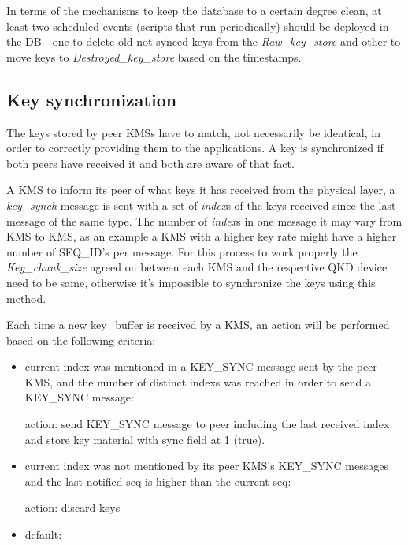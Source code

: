 \begin{refsection}
In terms of the mechanisms to keep the database to a certain degree clean, at least two scheduled events (scripts that run periodically) should be deployed in the \ac{DB} - one to delete old not synced keys from the \textit{Raw\_key\_store} and other to move keys to \textit{Destroyed\_key\_store} based on the timestamps.


\subsection{Key synchronization}
\label{key_synch}

The keys stored by peer \ac{KMS}s have to match, not necessarily be identical, in order to correctly providing them to the applications. A key is synchronized if both peers have received it and both are aware of that fact.

A \ac{KMS} to inform its peer of what keys it has received from the physical layer, a \textit{key\_synch} message is sent with a set of \textit{index}s of the keys received since the last message of the same type. The number of \textit{index}s in one message it may vary from KMS to KMS, as an example a \ac{KMS} with a higher key rate might have a higher number of SEQ\_ID's per message. For this process to work properly the \textit{Key\_chunk\_size} agreed on between each KMS and the respective QKD device need to be same, otherwise it's impossible to synchronize the keys using this method.

\vspace{5mm}

Each time a new key\_buffer is received by a KMS, an action will be performed based on the following criteria:
\begin{itemize}
\item current index  was mentioned in a KEY\_SYNC message sent by the peer KMS, and the number of distinct indexs was reached in order to send a KEY\_SYNC message:
	
action: send KEY\_SYNC message to peer including the last received index and store key material with sync field at 1 (true).

\item current index was not mentioned by its peer KMS’s KEY\_SYNC messages and the last notified seq is higher than the current seq:

action: discard keys

\item default:


\end{itemize}
\end{refsection}
